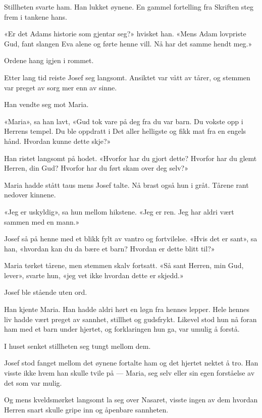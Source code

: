 Stillheten svarte ham.
Han lukket øynene.
En gammel fortelling fra Skriften steg frem i tankene hans.

«Er det Adams historie som gjentar seg?» hvisket han.
«Mens Adam lovpriste Gud, fant slangen Eva alene og førte henne vill.
Nå har det samme hendt meg.»

Ordene hang igjen i rommet.

Etter lang tid reiste Josef seg langsomt. Ansiktet var vått av tårer, og stemmen var preget av sorg mer enn av sinne.

Han vendte seg mot Maria.

«Maria», sa han lavt, «Gud tok vare på deg fra du var barn.
Du vokste opp i Herrens tempel. Du ble oppdratt i
Det aller helligste og fikk mat fra en engels hånd.
Hvordan kunne dette skje?»

Han ristet langsomt på hodet.
«Hvorfor har du gjort dette? Hvorfor har du glemt Herren, din Gud?
Hvorfor har du ført skam over deg selv?»

Maria hadde stått taus mens Josef talte. Nå brast også hun i gråt.
Tårene rant nedover kinnene.

«Jeg er uskyldig», sa hun mellom hikstene. «Jeg er ren.
Jeg har aldri vært sammen med en mann.»

Josef så på henne med et blikk fylt av vantro og fortvilelse.
«Hvis det er sant», sa han, «hvordan kan du da bære et barn?
Hvordan er dette blitt til?»

Maria tørket tårene, men stemmen skalv fortsatt.
«Så sant Herren, min Gud, lever», svarte hun,
«jeg vet ikke hvordan dette er skjedd.»

Josef ble stående uten ord.

Han kjente Maria. Han hadde aldri hørt en løgn fra hennes lepper.
Hele hennes liv hadde vært preget av sannhet, stillhet og gudsfrykt.
Likevel stod hun nå foran ham med et barn under hjertet,
og forklaringen hun ga, var umulig å forstå.

I huset senket stillheten seg tungt mellom dem.

Josef stod fanget mellom det øynene fortalte ham
og det hjertet nektet å tro. Han visste ikke hvem han skulle tvile på –--
Maria, seg selv eller sin egen forståelse av det som var mulig.

Og mens kveldsmørket langsomt la seg over Nasaret,
visste ingen av dem hvordan Herren snart skulle gripe
inn og åpenbare sannheten.
